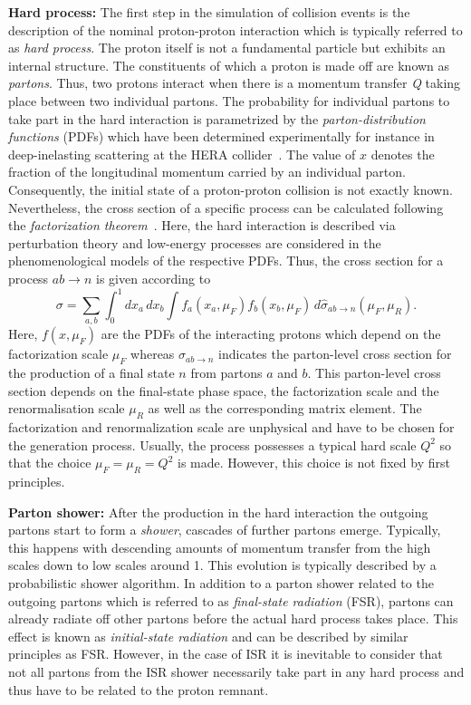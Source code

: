 \begin{description} 
 \item \textbf{Hard process:} The first step in the simulation of collision events is the description of the nominal proton-proton interaction which is typically referred to as \textit{hard process}. The proton itself is not a fundamental particle but exhibits an internal structure. The constituents of which a proton is made off are known as \textit{partons}. Thus, two protons interact when there is a momentum transfer \textit{Q} taking place between two individual partons. The probability for individual partons to take part in the hard interaction is parametrized by the \textit{parton-distribution functions} (PDFs) which have been determined experimentally for instance in deep-inelasting scattering at the HERA collider~\cite{bib:CombinedHERA:2009wt}. The value of $x$ denotes the fraction of the longitudinal momentum carried by an individual parton. Consequently, the initial state of a proton-proton collision is not exactly known. Nevertheless, the cross section of a specific process can be calculated following the \textit{factorization theorem}~\cite{Collins:1987pm, Collins:1989gx}. Here, the hard interaction is described via perturbation theory and low-energy processes are considered in the phenomenological models of the respective PDFs. Thus, the cross section for a process $ab \rightarrow n$ is given according to
\begin{equation}
 \sigma = \sum_{a,b} \int_{0}^{1} dx_{a} \, dx_{b} \int f_{a}(x_{a}, \mu_{F}) f_{b}(x_{b}, \mu_{F}) \, d\hat{\sigma}_{ab \rightarrow n} (\mu_{F}, \mu_{R}). 
\end{equation}
Here, $f(x, \mu_{F})$ are the PDFs of the interacting protons which depend on the factorization scale $\mu_{F}$ whereas $\sigma_{ab \rightarrow n}$ indicates the parton-level cross section for the production of a final state $n$ from partons $a$ and $b$. This parton-level cross section depends on the final-state phase space, the factorization scale and the renormalisation scale $\mu_{R}$ as well as the corresponding matrix element. The factorization and renormalization scale are unphysical and have to be chosen for the generation process. Usually, the process possesses a typical hard scale $Q^{2}$ so that the choice $\mu_{F} = \mu_{R} = Q^{2}$ is made. However, this choice is not fixed by first principles.
\item \textbf{Parton shower:} After the production in the hard interaction the outgoing partons start to form a \textit{shower}, \ie cascades of further partons emerge. Typically, this happens with descending amounts of momentum transfer from the high scales down to low scales around 1\gev. This evolution is typically described by a probabilistic shower algorithm. In addition to a parton shower related to the outgoing partons which is referred to as \textit{final-state radiation} (FSR), partons can already radiate off other partons before the actual hard process takes place. This effect is known as \textit{initial-state radiation} and can be described by similar principles as FSR. However, in the case of ISR it is inevitable to consider that not all partons from the ISR shower necessarily take part in any hard process and thus have to be related to the proton remnant.  

\end{description}
